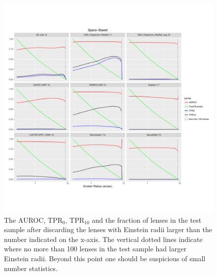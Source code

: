 \documentclass{aa}
\begin{document}
\begin{figure}
 \includegraphics[width=2\columnwidth]{figures/einstein_space.pdf}
 \caption{The AUROC, TPR$_0$, TPR$_{10}$ and the fraction of lenses in the test sample after discarding the lenses with Einstein radii larger than the number indicated on the x-axis. The vertical dotted lines indicate where no more than 100 lenses in the test sample had larger Einstein radii.  Beyond this point one should be suspicious of small number statistics.  }
 \label{fig:einstein_space}
\end{figure}
\end{document}
